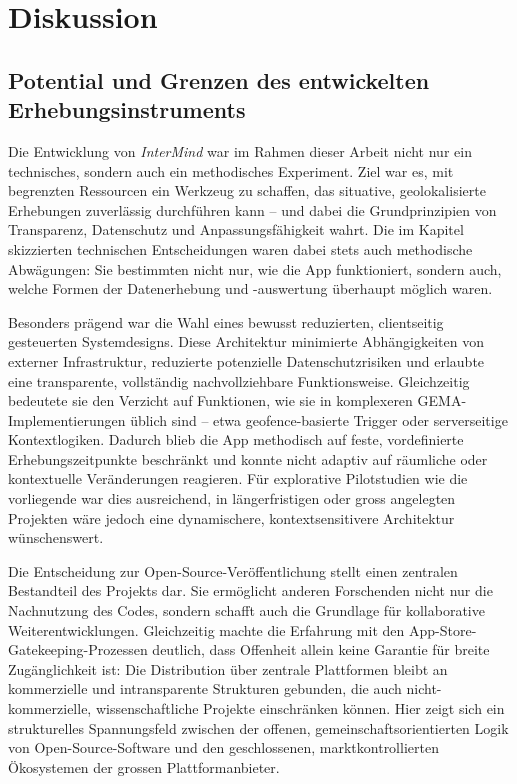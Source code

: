 
\chapter{Diskussion} \label{sec:diskussion}

\section{Potential und Grenzen des entwickelten Erhebungsinstruments}

Die Entwicklung von \textit{InterMind} war im Rahmen dieser Arbeit nicht nur ein technisches, sondern auch ein methodisches Experiment. Ziel war es, mit begrenzten Ressourcen ein Werkzeug zu schaffen, das situative, geolokalisierte Erhebungen zuverlässig durchführen kann -- und dabei die Grundprinzipien von Transparenz, Datenschutz und Anpassungsfähigkeit wahrt. Die im Kapitel skizzierten technischen Entscheidungen waren dabei stets auch methodische Abwägungen: Sie bestimmten nicht nur, wie die App funktioniert, sondern auch, welche Formen der Datenerhebung und -auswertung überhaupt möglich waren.

Besonders prägend war die Wahl eines bewusst reduzierten, clientseitig gesteuerten Systemdesigns. Diese Architektur minimierte Abhängigkeiten von externer Infrastruktur, reduzierte potenzielle Datenschutzrisiken und erlaubte eine transparente, vollständig nachvollziehbare Funktionsweise. Gleichzeitig bedeutete sie den Verzicht auf Funktionen, wie sie in komplexeren GEMA-Implementierungen üblich sind -- etwa geofence-basierte Trigger oder serverseitige Kontextlogiken. Dadurch blieb die App methodisch auf feste, vordefinierte Erhebungszeitpunkte beschränkt und konnte nicht adaptiv auf räumliche oder kontextuelle Veränderungen reagieren. Für explorative Pilotstudien wie die vorliegende war dies ausreichend, in längerfristigen oder gross angelegten Projekten wäre jedoch eine dynamischere, kontextsensitivere Architektur wünschenswert.

Die Entscheidung zur Open-Source-Veröffentlichung stellt einen zentralen Bestandteil des Projekts dar. Sie ermöglicht anderen Forschenden nicht nur die Nachnutzung des Codes, sondern schafft auch die Grundlage für kollaborative Weiterentwicklungen. Gleichzeitig machte die Erfahrung mit den App-Store-Gatekeeping-Prozessen deutlich, dass Offenheit allein keine Garantie für breite Zugänglichkeit ist: Die Distribution über zentrale Plattformen bleibt an kommerzielle und intransparente Strukturen gebunden, die auch nicht-kommerzielle, wissenschaftliche Projekte einschränken können. Hier zeigt sich ein strukturelles Spannungsfeld zwischen der offenen, gemeinschaftsorientierten Logik von Open-Source-Software und den geschlossenen, marktkontrollierten Ökosystemen der grossen Plattformanbieter.

